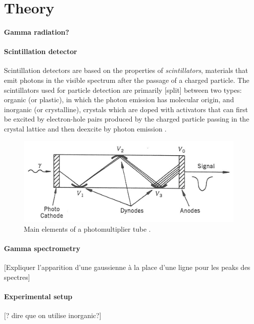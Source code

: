 \section{Theory}
\paragraph{Gamma radiation?}

\paragraph{Scintillation detector}
Scintillation detectors are based on the properties of \emph{scintillators}, 
materials that emit photons in the visible spectrum after the passage of a charged particle.
The scintillators used for particle detection are primarily [split] between two types: 
organic (or plastic), in which the photon emission has molecular origin, 
and inorganic (or crystalline), crystals which are doped with activators that can first be excited by electron-hole pairs 
produced by the charged particle passing in the crystal lattice and then deexcite by photon emission \cite{intro_nuclear_particle_physics}.

\begin{figure}[htbp]
    \centering
    \includegraphics[scale=1]{figures/photomultiplier.jpg}
    \caption{Main elements of a photomultiplier tube \cite{intro_nuclear_particle_physics}.}
    \label{fig:photomultiplier}
\end{figure}

\paragraph{Gamma spectrometry}
[Expliquer l'apparition d'une gaussienne à la place d'une ligne pour les peaks des spectres]


\paragraph{Experimental setup}
[? dire que on utilise inorganic?]